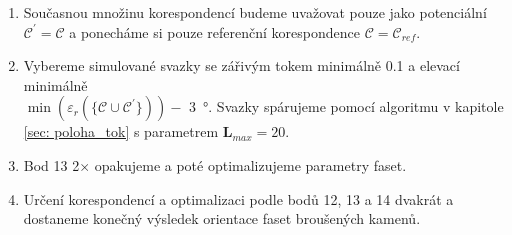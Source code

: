 \begin{enumerate}
\item Současnou množinu korespondencí budeme uvažovat pouze jako potenciální $\mathcal{C}^\prime = \mathcal{C}$ a ponecháme si pouze referenční korespondence $\mathcal{C} = \mathcal{C}_{ref}$. 

\item Vybereme simulované svazky se zářivým tokem minimálně \SI{0.1}{\permille} a elevací minimálně \\ $\min\left( \varepsilon_r( \lbrace\mathcal{C} \cup \mathcal{C}^\prime\rbrace ) \right) - $ \SI{3}{\degree}. Svazky spárujeme pomocí algoritmu v kapitole \ref{sec: poloha_tok} s parametrem $\mathbf{L}_{max} = 20$.

\item Bod 13 2$\times$ opakujeme a poté optimalizujeme parametry faset. 

\item Určení korespondencí a optimalizaci podle bodů 12, 13 a 14 dvakrát a dostaneme konečný výsledek orientace faset broušených kamenů.

\end{enumerate}

\clearpage